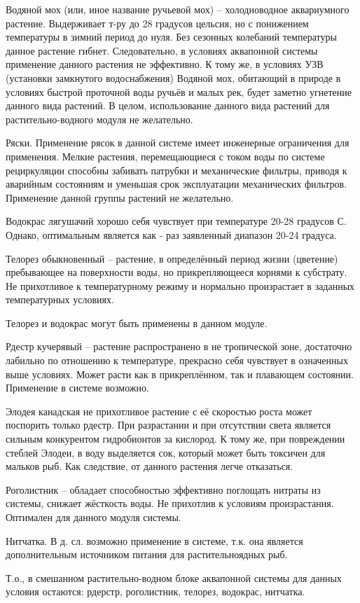 Водяной мох (или, иное название ручьевой мох) – холодноводное аквариумного растение. Выдерживает т-ру до 28 градусов цельсия, но с понижением температуры в зимний период до нуля. Без сезонных колебаний температуры  данное растение гибнет. Следовательно, в условиях аквапонной системы применение данного растения не эффективно. К тому же, в условиях УЗВ (установки замкнутого водоснабжения) Водяной мох, обитающий в природе в условиях быстрой проточной воды ручьёв и малых рек, будет заметно угнетение данного вида растений. В целом, использование данного вида растений для растительно-водного модуля не желательно.

Ряски. Применение рясок в данной системе имеет инженерные ограничения для применения. Мелкие растения, перемещающиеся с током воды по системе рециркуляции способны забивать патрубки и механические фильтры, приводя к аварийным состояниям и уменьшая срок эксплуатации механических фильтров. Применение данной группы растений не желательно. 

Водокрас лягушачий хорошо себя чувствует при температуре 20-28 градусов С. Однако, оптимальным является как - раз заявленный диапазон 20-24 градуса. 

Телорез обыкновенный – растение, в определённый период жизни (цветение) пребывающее на поверхности воды, но прикрепляющееся корнями к субстрату. Не прихотливое к температурному режиму и нормально произрастает в заданных температурных условиях.

Телорез и водокрас могут быть применены в данном модуле.

Рдестр кучерявый – растение распространено в не тропической зоне, достаточно лабильно по отношению к температуре, прекрасно себя чувствует в означенных выше условиях. Может расти как в прикреплённом, так и плавающем состоянии. Применение в системе возможно.

Элодея канадская не прихотливое растение с её скоростью роста может поспорить только рдестр. При разрастании и при отсутствии света является сильным конкурентом гидробионтов за кислород. К тому же, при повреждении стеблей Элодеи, в воду выделяется сок, который может быть токсичен для мальков рыб. Как следствие, от данного растения легче отказаться.

Роголистник – обладает способностью эффективно поглощать нитраты из системы, снижает жёсткость воды. Не прихотлив к условиям произрастания. Оптимален для данного модуля системы.

Нитчатка. В д. сл. возможно применение в системе, т.к. она является дополнительным источником питания для растительноядных рыб.

Т.о., в смешанном растительно-водном блоке аквапонной системы для данных условия остаются: рдерстр, роголистник, телорез, водокрас, нитчатка.

